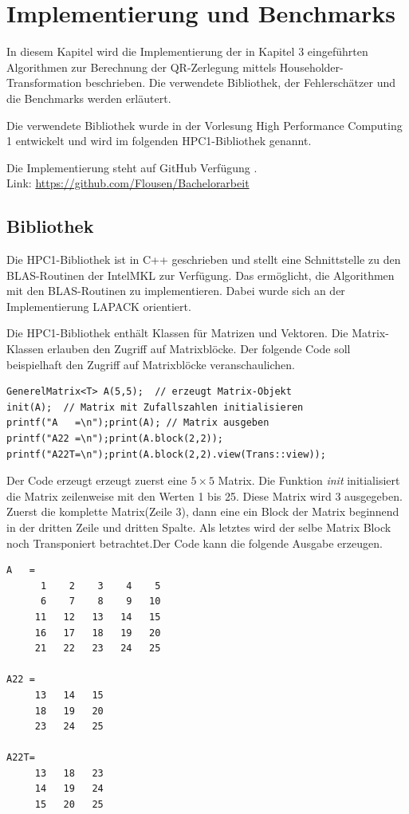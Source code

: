 \chapter{Implementierung und Benchmarks}

In diesem Kapitel wird die Implementierung der in Kapitel 3 eingeführten Algorithmen zur Berechnung der QR-Zerlegung mittels Householder-Transformation beschrieben. 
Die verwendete Bibliothek, der Fehlerschätzer und die Benchmarks werden erläutert. 

Die verwendete Bibliothek wurde in der Vorlesung High Performance Computing 1 entwickelt \cite{HPC1} und wird im folgenden HPC1-Bibliothek genannt.


Die Implementierung steht auf GitHub Verfügung \cite{git}.\\
Link: \url{https://github.com/Flousen/Bachelorarbeit}

\section{Bibliothek}
Die HPC1-Bibliothek ist in C++ geschrieben und stellt eine Schnittstelle zu den BLAS-Routinen der IntelMKL zur Verfügung.
Das ermöglicht, die Algorithmen mit den BLAS-Routinen zu implementieren.
Dabei wurde sich an der Implementierung LAPACK orientiert.


Die HPC1-Bibliothek enthält Klassen für Matrizen und Vektoren.
Die Matrix-Klassen erlauben den Zugriff auf Matrixblöcke. 
Der folgende Code soll beispielhaft den Zugriff auf Matrixblöcke veranschaulichen.
\begin{lstlisting}
GenerelMatrix<T> A(5,5);  // erzeugt Matrix-Objekt
init(A);  // Matrix mit Zufallszahlen initialisieren
printf("A   =\n");print(A); // Matrix ausgeben
printf("A22 =\n");print(A.block(2,2));
printf("A22T=\n");print(A.block(2,2).view(Trans::view));
\end{lstlisting}
Der Code erzeugt erzeugt zuerst eine $5 \times 5$ Matrix.
Die Funktion \textit{init} initialisiert die Matrix zeilenweise mit den Werten 1 bis 25.
Diese Matrix wird 3 ausgegeben. Zuerst die komplette Matrix(Zeile 3), dann eine ein Block der Matrix beginnend in der dritten Zeile und dritten Spalte. Als letztes wird der selbe Matrix Block noch Transponiert betrachtet.Der Code kann die folgende Ausgabe erzeugen.
\lstset{numbers=none}
\begin{lstlisting} 
A   = 
      1    2    3    4    5
      6    7    8    9   10
     11   12   13   14   15
     16   17   18   19   20
     21   22   23   24   25

A22 = 
     13   14   15
     18   19   20
     23   24   25

A22T= 
     13   18   23
     14   19   24
     15   20   25
\end{lstlisting}

